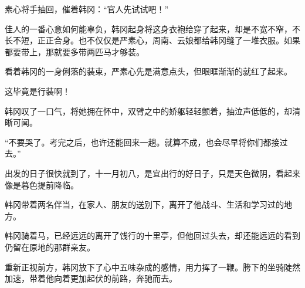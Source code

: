 素心将手抽回，催着韩冈：“官人先试试吧！”

佳人的一番心意如何能辜负，韩冈起身将这身衣袍给穿了起来，却是不宽不窄，不长不短，正正合身。也不仅仅是严素心，周南、云娘都给韩冈缝了一堆衣服。如果都要带上，那就要多带两匹马才够装。

看着韩冈的一身俐落的装束，严素心先是满意点头，但眼眶渐渐的就红了起来。

这毕竟是行装啊！

韩冈叹了一口气，将她拥在怀中，双臂之中的娇躯轻轻颤着，抽泣声低低的，却清晰可闻。

“不要哭了。考完之后，也许还能回来一趟。就算不成，也会尽早将你们都接过去。”

出发的日子很快就到了，十一月初八，是宜出行的好日子，只是天色微阴，看起来像是暮色提前降临。

韩冈带着两名伴当，在家人、朋友的送别下，离开了他战斗、生活和学习过的地方。

韩冈骑着马，已经远远的离开了饯行的十里亭，但他回过头去，却还能远远的看到仍留在原地的那群亲友。

重新正视前方，韩冈放下了心中五味杂成的感情，用力挥了一鞭。胯下的坐骑陡然加速，带着他向着更加起伏的前路，奔驰而去。

